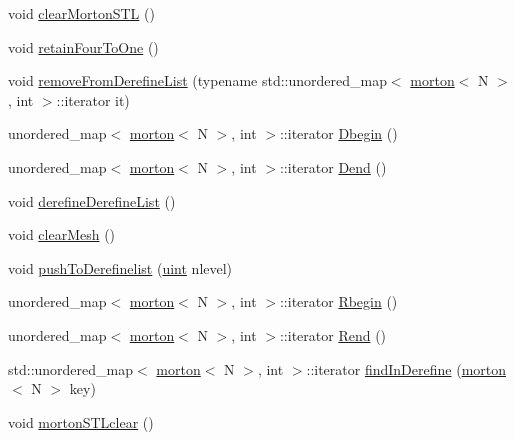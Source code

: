 \begin{DoxyCompactItemize}
\item 
void \mbox{\hyperlink{classTree_a2c51dee6b6d3a07a38fbd465adab62f8}{clear\+Morton\+S\+TL}} ()
\item 
void \mbox{\hyperlink{classTree_a017dbf01d574294edbd8e9003e8d0002}{retain\+Four\+To\+One}} ()
\item 
void \mbox{\hyperlink{classTree_a69539d7a5eb07c519460846207b50ae8}{remove\+From\+Derefine\+List}} (typename std\+::unordered\+\_\+map$<$ \mbox{\hyperlink{definitions_8h_af8682350bd8bb38ee9023f7a0a310add}{morton}}$<$ N $>$, int $>$\+::iterator it)
\item 
unordered\+\_\+map$<$ \mbox{\hyperlink{definitions_8h_af8682350bd8bb38ee9023f7a0a310add}{morton}}$<$ N $>$, int $>$\+::iterator \mbox{\hyperlink{classTree_aba8489b0b3498e5995e1ab0fc6a7fbab}{Dbegin}} ()
\item 
unordered\+\_\+map$<$ \mbox{\hyperlink{definitions_8h_af8682350bd8bb38ee9023f7a0a310add}{morton}}$<$ N $>$, int $>$\+::iterator \mbox{\hyperlink{classTree_a89894433bb64a326f411f328890b187a}{Dend}} ()
\item 
void \mbox{\hyperlink{classTree_ac151fd0d1ed04e995d03d3cc6b5f7237}{derefine\+Derefine\+List}} ()
\item 
void \mbox{\hyperlink{classTree_a3dab87d8315821f5ee2cc20a1b80c393}{clear\+Mesh}} ()
\item 
void \mbox{\hyperlink{classTree_a52c75138e39fc5ee1cb034b3ef3d9b97}{push\+To\+Derefinelist}} (\mbox{\hyperlink{definitions_8h_a69aa29b598b851b0640aa225a9e5d61d}{uint}} nlevel)
\item 
unordered\+\_\+map$<$ \mbox{\hyperlink{definitions_8h_af8682350bd8bb38ee9023f7a0a310add}{morton}}$<$ N $>$, int $>$\+::iterator \mbox{\hyperlink{classTree_aac90381448bee888a44fb8089023d0d8}{Rbegin}} ()
\item 
unordered\+\_\+map$<$ \mbox{\hyperlink{definitions_8h_af8682350bd8bb38ee9023f7a0a310add}{morton}}$<$ N $>$, int $>$\+::iterator \mbox{\hyperlink{classTree_aa3414a027171fb07f8f4b9acb0699d9a}{Rend}} ()
\item 
std\+::unordered\+\_\+map$<$ \mbox{\hyperlink{definitions_8h_af8682350bd8bb38ee9023f7a0a310add}{morton}}$<$ N $>$, int $>$\+::iterator \mbox{\hyperlink{classTree_a7844a0ee00798d6058e7a741cfe0e85b}{find\+In\+Derefine}} (\mbox{\hyperlink{definitions_8h_af8682350bd8bb38ee9023f7a0a310add}{morton}}$<$ N $>$ key)
\item 
void \mbox{\hyperlink{classTree_ad5d7ea8995c06e23b58f1ba00403427c}{morton\+S\+T\+Lclear}} ()
\item 

\end{DoxyCompactItemize}
